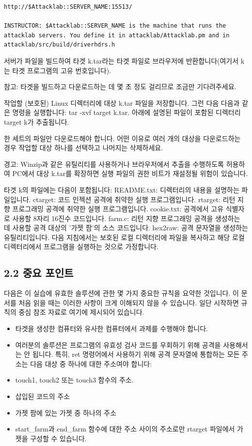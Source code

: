 \documentclass[10pt]{article}
\begin{document}
\begin{verbatim}
http://$Attacklab::SERVER_NAME:15513/

INSTRUCTOR: $Attacklab::SERVER_NAME is the machine that runs the
attacklab servers. You define it in attacklab/Attacklab.pm and in
attacklab/src/build/driverhdrs.h
\end{verbatim}

\noindent
서버가 파일을 빌드하여 타겟 k.tar라는 타겟 파일로 브라우저에 반환합니다(여기서 k는 타겟 프로그램의 고유 번호입니다).

\noindent
참고: 타겟을 빌드하고 다운로드하는 데 몇 초 정도 걸리므로 조금만 기다려주세요.

\noindent
작업할 (보호된) Linux 디렉터리에 대상 k.tar 파일을 저장합니다. 그런 다음 다음과 같은 명령을 실행합니다: tar -xvf target k.tar. 아래에 설명된 파일이 포함된 디렉터리 target k가 추출됩니다.

\noindent
한 세트의 파일만 다운로드해야 합니다. 어떤 이유로 여러 개의 대상을 다운로드하는 경우 작업할 대상 하나를 선택하고 나머지는 삭제하세요.

\noindent
경고: Winzip과 같은 유틸리티를 사용하거나 브라우저에서 추출을 수행하도록 허용하여 PC에서 대상 k.tar를 확장하면 실행 파일의 권한 비트가 재설정될 위험이 있습니다.

\noindent
타겟 k의 파일에는 다음이 포함됩니다:
\noindent
README.txt: 디렉터리의 내용을 설명하는 파일입니다.
\noindent
ctarget: 코드 인젝션 공격에 취약한 실행 프로그램입니다.
\noindent
rtarget: 리턴 지향 프로그래밍 공격에 취약한 실행 프로그램입니다.
\noindent
cookie.txt: 공격에서 고유 식별자로 사용할 8자리 16진수 코드입니다.
\noindent
farm.c: 리턴 지향 프로그래밍 공격을 생성하는 데 사용할 공격 대상의 '가젯 팜'의 소스 코드입니다.
\noindent
hex2raw: 공격 문자열을 생성하는 유틸리티입니다. 
\noindent
다음 지침에서는 보호된 로컬 디렉터리에 파일을 복사하고 해당 로컬 디렉터리에서 프로그램을 실행하는 것으로 가정합니다.

\subsection*{2.2 중요 포인트}
다음은 이 실습에 유효한 솔루션에 관한 몇 가지 중요한 규칙을 요약한 것입니다. 이 문서를 처음 읽을 때는 이러한 사항이 크게 이해되지 않을 수 있습니다. 일단 시작하면 규칙의 중심 참조 자료로 여기에 제시되어 있습니다.

\begin{itemize}
\item 타겟을 생성한 컴퓨터와 유사한 컴퓨터에서 과제를 수행해야 합니다.
  \item 여러분의 솔루션은 프로그램의 유효성 검사 코드를 우회하기 위해 공격을 사용해서는 안 됩니다. 특히, ret 명령어에서 사용하기 위해 공격 문자열에 통합하는 모든 주소는 다음 대상 중 하나에 대한 주소여야 합니다:
  \item touch1, touch2 또는 touch3 함수의 주소.
  \item 삽입된 코드의 주소
  \item 가젯 팜에 있는 가젯 중 하나의 주소
  \item start\_farm과 end\_farm 함수에 대한 주소 사이의 주소로만 rtarget 파일에서 가젯을 구성할 수 있습니다.
\end{itemize}
\end{document}
